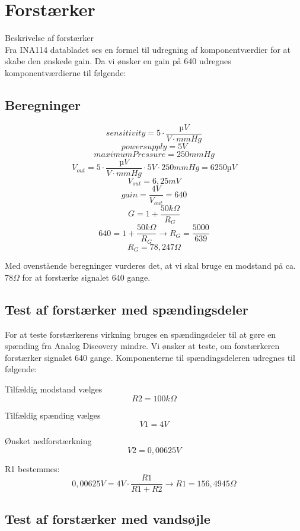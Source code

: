 \section{Forstærker}
Beskrivelse af forstærker \\
Fra INA114 databladet ses en formel til udregning af komponentværdier for at skabe den ønskede gain. Da vi ønsker en gain på 640 udregnes komponentværdierne til følgende:

\subsection{Beregninger}
\vspace{0.5 cm}
\[ sensitivity = 5\cdot\frac{µV}{V\cdot mmHg} \]
\[ powersupply = 5V \]
\[ maximumPressure = 250 mmHg \]
\[ V_{out} =5\cdot\frac{µV}{V\cdot mmHg} \cdot 5V \cdot 250 mmHg = 6250 µV \]
\[ V_{out} =6,25 mV \]
\[ gain = \frac{4V}{V_{out}} = 640 \]
\[ G = 1+\frac{50k\Omega}{R_{G}} \]
\[ 640 = 1+\frac{50k\Omega}{R_{G}} \rightarrow R_{G}=\frac{5000}{639}\]
\[ R_{G} = 78,247 \Omega \]

Med ovenstående beregninger vurderes det, at vi skal bruge en modstand på ca. 78$\Omega$ for at forstærke signalet 640 gange.

\vspace{0.5 cm}

\subsection{Test af forstærker med spændingsdeler}
\vspace{0.2 cm}
For at teste forstærkerens virkning bruges en spændingsdeler til at gøre en spænding fra Analog Discovery mindre. Vi ønsker at teste, om forstærkeren forstærker signalet 640 gange. Komponenterne til spændingsdeleren udregnes til følgende:

Tilfældig modstand vælges
\[ R2=100 k\Omega \]

Tilfældig spænding vælges
\[ V1 = 4V \]

Ønsket nedforstærkning
\[ V2=0,00625V\]

R1 bestemmes:
\[ 0,00625V = 4V\cdot \frac{R1}{R1+R2}\rightarrow R1 = 156,4945 \Omega\]

\clearpage


\subsection{Test af forstærker med vandsøjle}

\clearpage

